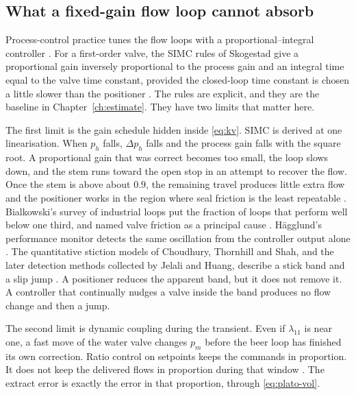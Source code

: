 \subsection{What a fixed-gain flow loop cannot absorb}

Process-control practice tunes the flow loops with a proportional--integral controller \cite{ziegler1942optimum,rivera1986imc,skogestad2003simc,astrom2006advanced}. For a first-order valve, the SIMC rules of Skogestad give a proportional gain inversely proportional to the process gain and an integral time equal to the valve time constant, provided the closed-loop time constant is chosen a little slower than the positioner \cite{skogestad2003simc}. The rules are explicit, and they are the baseline in Chapter~\ref{ch:estimate}. They have two limits that matter here.

The first limit is the gain schedule hidden inside \eqref{eq:kv}. SIMC is derived at one linearisation. When $p_h$ falls, $\Delta p_h$ falls and the process gain falls with the square root. A proportional gain that was correct becomes too small, the loop slows down, and the stem runs toward the open stop in an attempt to recover the flow. Once the stem is above about $0.9$, the remaining travel produces little extra flow and the positioner works in the region where seal friction is the least repeatable \cite{fisher2005valve,choudhury2005modelling}. Bialkowski's survey of industrial loops put the fraction of loops that perform well below one third, and named valve friction as a principal cause \cite{bialkowski1993dreams}. H\"agglund's performance monitor detects the same oscillation from the controller output alone \cite{hagglund1995monitor}. The quantitative stiction models of Choudhury, Thornhill and Shah, and the later detection methods collected by Jelali and Huang, describe a stick band and a slip jump \cite{choudhury2005modelling,choudhury2008stiction,jelali2010stiction}. A positioner reduces the apparent band, but it does not remove it. A controller that continually nudges a valve inside the band produces no flow change and then a jump.

The second limit is dynamic coupling during the transient. Even if $\lambda_{11}$ is near one, a fast move of the water valve changes $p_m$ before the beer loop has finished its own correction. Ratio control on setpoints keeps the commands in proportion. It does not keep the delivered flows in proportion during that window \cite{shinskey1996process,luyben1990process}. The extract error is exactly the error in that proportion, through \eqref{eq:plato-vol}.

